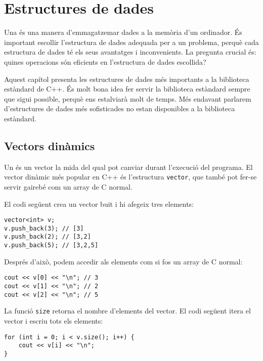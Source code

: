 \chapter{Estructures de dades}


Una  és una manera d'emmagatzemar
dades a la memòria d'un ordinador.
És important escollir l'estructura
de dades adequada per a un problema,
perquè cada estructura de dades té els seus
avantatges i inconvenients.
La pregunta crucial és: quines operacions
són eficients en l'estructura de dades escollida?

Aquest capítol presenta les estructures de dades
més importants a la biblioteca estàndard de C++.
És molt bona idea fer servir la biblioteca estàndard
sempre que sigui possible,
perquè ens estalviarà molt de temps.
Més endavant parlarem d'estructures de dades més sofisticades
no estan disponibles a la biblioteca estàndard.

\section{Vectors dinàmics}


Un  és un vector la mida
del qual pot canviar durant l'execució
del programa.
El vector dinàmic més popular en C++ és
l'estructura \texttt{vector},
que també pot fer-se servir gairebé com un array de C normal.

El codi següent crea un vector buit i
hi afegeix tres elements:

\begin{lstlisting}
vector<int> v;
v.push_back(3); // [3]
v.push_back(2); // [3,2]
v.push_back(5); // [3,2,5]
\end{lstlisting}

Després d'això, podem accedir als elements com si fos un array de C
normal:

\begin{lstlisting}
cout << v[0] << "\n"; // 3
cout << v[1] << "\n"; // 2
cout << v[2] << "\n"; // 5
\end{lstlisting}

La funció \texttt{size} retorna el nombre d'elements del vector.
El codi següent itera
el vector i escriu tots els elements:

\begin{lstlisting}
for (int i = 0; i < v.size(); i++) {
    cout << v[i] << "\n";
}
\end{lstlisting}

